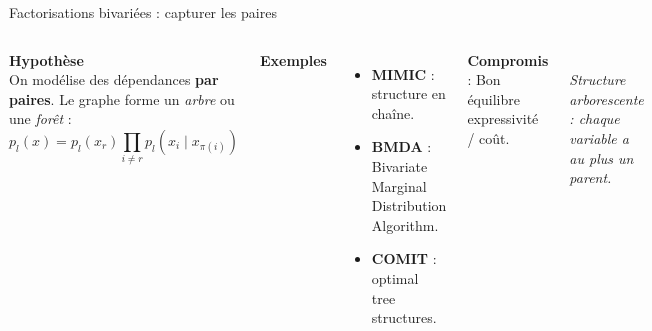 \documentclass[10pt,aspectratio=169]{beamer}
\begin{document}
\begin{frame}{Factorisations bivariées : capturer les paires}
\begin{columns}[T]
\textbf{Hypothèse}\\[0.1cm]
On modélise des dépendances \textbf{par paires}. Le graphe forme un \emph{arbre} ou une \emph{forêt} :
\[
p_l(x) = p_l(x_{r}) \prod_{i \ne r} p_l(x_i \mid x_{\pi(i)})
\]

\vspace{0.2cm}
\textbf{Exemples}\\[0.1cm]
\begin{itemize}
  \item \textbf{MIMIC} : structure en chaîne.
  \item \textbf{BMDA} : Bivariate Marginal Distribution Algorithm.
  \item \textbf{COMIT} : optimal tree structures.
\end{itemize}

\vspace{0.2cm}
\textbf{Compromis} : Bon équilibre expressivité / coût.

\centering
{}\\[0.3cm]
\footnotesize\textit{Structure arborescente : chaque variable a au plus un parent.}
\end{columns}
\end{frame}
\end{document}
